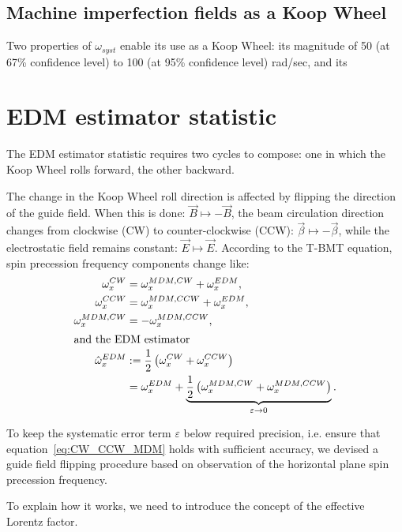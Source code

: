 \documentclass[a4paper]{jacow}
\newcommand{\w}{\omega}
\begin{document}
\subsection{Machine imperfection fields as a Koop Wheel}

Two properties of $\w_{syst}$ enable its use as a Koop Wheel: its magnitude of 50 (at 67\% confidence level) to 100 (at 95\% confidence level) rad/sec, and its 

\section{EDM estimator statistic}
The EDM estimator statistic requires two cycles to compose: one in which the Koop Wheel rolls forward, the other backward.

The change in the Koop Wheel roll direction is affected by flipping the direction of the guide field. When this is done:
$\vec B \mapsto -\vec B$, the beam circulation direction changes from clockwise (CW) to counter-clockwise (CCW): 
$\vec\beta \mapsto -\vec\beta$, while the electrostatic field remains constant: $\vec E \mapsto \vec E$.
According to the T-BMT equation, spin precession frequency components change like:
\begin{subequations}
  \begin{align}
    \w_x^{CW} &= \w_x^{MDM, CW}   + \w_x^{EDM}, \notag\\
    \w_x^{CCW} &= \w_x^{MDM, CCW} + \w_x^{EDM}, \notag\\
    \w_x^{MDM, CW} &= -\w_x^{MDM, CCW}, \label{eq:CW_CCW_MDM}\\
    \intertext{and the EDM estimator}
    \hat\w_x^{EDM} &:= \frac12\bkt{\w_x^{CW} + \w_x^{CCW}} \label{eq:FDM_estimator} \\
                   &=  \w_x^{EDM} +
                       \underbrace{\frac12\bkt{\w_x^{MDM, CW} + \w_x^{MDM, CCW}}}_{\varepsilon \to 0}.
  \end{align}
\end{subequations}

To keep the systematic error term $\varepsilon$ below required precision, i.e. ensure
that equation~\eqref{eq:CW_CCW_MDM} holds with sufficient accuracy, we devised a guide field flipping procedure
based on observation of the horizontal plane spin precession frequency.

To explain how it works, we need to introduce the concept of the effective Lorentz factor.
\end{document}
